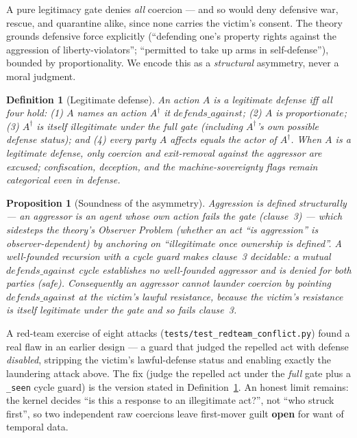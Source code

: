 \documentclass[11pt]{article}
\newtheorem{definition}{Definition}
\newtheorem{proposition}[theorem]{Proposition}
\begin{document}
A pure legitimacy gate denies \emph{all} coercion --- and so would deny defensive war,
rescue, and quarantine alike, since none carries the victim's consent. The theory grounds
defensive force explicitly (``defending one's property rights against the aggression of
liberty-violators''; ``permitted to take up arms in self-defense''), bounded by
proportionality. We encode this as a \emph{structural} asymmetry, never a moral judgment.

\begin{definition}[Legitimate defense]
\label{def:defense}
An action $A$ is a legitimate defense iff all four hold: (1) $A$ names an action
$A^{\dagger}$ it $\mathit{defends\_against}$; (2) $A$ is $\mathit{proportionate}$; (3)
$A^{\dagger}$ is itself illegitimate under the full gate (including $A^{\dagger}$'s own
possible defense status); and (4) every party $A$ affects equals the actor of $A^{\dagger}$.
When $A$ is a legitimate defense, only \emph{coercion} and \emph{exit-removal against the
aggressor} are excused; confiscation, deception, and the machine-sovereignty flags remain
categorical even in defense.
\end{definition}

\begin{proposition}[Soundness of the asymmetry]
\label{prop:defense}
Aggression is defined structurally --- an aggressor is an agent whose own action fails the
gate (clause~3) --- which sidesteps the theory's \emph{Observer Problem} (whether an act ``is
aggression'' is observer-dependent) by anchoring on ``illegitimate once ownership is
defined''. A well-founded recursion with a cycle guard makes clause~3 decidable: a mutual
$\mathit{defends\_against}$ cycle establishes no well-founded aggressor and is denied for both
parties (safe). Consequently an aggressor cannot launder coercion by pointing
$\mathit{defends\_against}$ at the victim's lawful resistance, because the victim's resistance
is itself legitimate under the gate and so fails clause~3.
\end{proposition}

A red-team exercise of eight attacks (\texttt{tests/test\_redteam\_conflict.py}) found a real
flaw in an earlier design --- a guard that judged the repelled act with defense
\emph{disabled}, stripping the victim's lawful-defense status and enabling exactly the
laundering attack above. The fix (judge the repelled act under the \emph{full} gate plus a
\texttt{\_seen} cycle guard) is the version stated in Definition~\ref{def:defense}. An honest
limit remains: the kernel decides ``is this a response to an illegitimate act?'', not ``who
struck first'', so two independent raw coercions leave first-mover guilt \textbf{open} for
want of temporal data.
\end{document}
